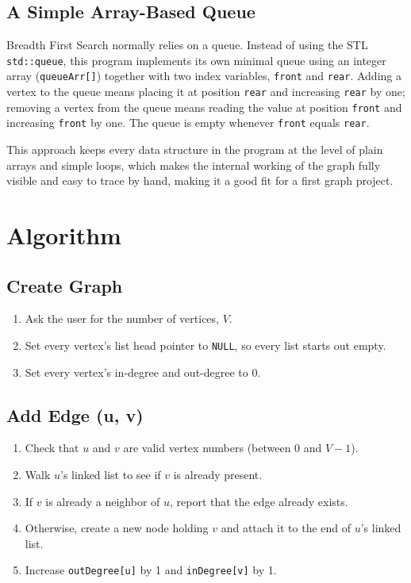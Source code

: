 \documentclass[11pt]{article}
\begin{document}
\subsection*{A Simple Array-Based Queue}
Breadth First Search normally relies on a queue. Instead of using the STL \texttt{std::queue}, this program implements its own minimal queue using an integer array (\texttt{queueArr[]}) together with two index variables, \texttt{front} and \texttt{rear}. Adding a vertex to the queue means placing it at position \texttt{rear} and increasing \texttt{rear} by one; removing a vertex from the queue means reading the value at position \texttt{front} and increasing \texttt{front} by one. The queue is empty whenever \texttt{front} equals \texttt{rear}.

This approach keeps every data structure in the program at the level of plain arrays and simple loops, which makes the internal working of the graph fully visible and easy to trace by hand, making it a good fit for a first graph project.

\section{Algorithm}

\subsection{Create Graph}
\begin{enumerate}[topsep=2pt, itemsep=2pt]
  \item Ask the user for the number of vertices, $V$.
  \item Set every vertex's list head pointer to \texttt{NULL}, so every list starts out empty.
  \item Set every vertex's in-degree and out-degree to 0.
\end{enumerate}

\subsection{Add Edge (u, v)}
\begin{enumerate}[topsep=2pt, itemsep=2pt]
  \item Check that $u$ and $v$ are valid vertex numbers (between 0 and $V-1$).
  \item Walk $u$'s linked list to see if $v$ is already present.
  \item If $v$ is already a neighbor of $u$, report that the edge already exists.
  \item Otherwise, create a new node holding $v$ and attach it to the end of $u$'s linked list.
  \item Increase \texttt{outDegree[u]} by 1 and \texttt{inDegree[v]} by 1.
\end{enumerate}
\end{document}
